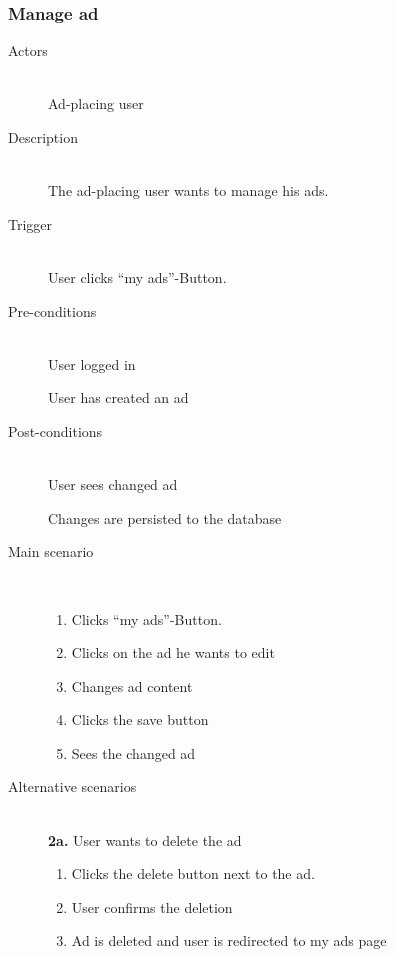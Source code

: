 \documentclass[a4wide]{article}
\begin{document}
\subsubsection{Manage ad}
\begin{description}
\item[Actors]\mbox{}\\
Ad-placing user
\item[Description]\mbox{}\\
The ad-placing user wants to manage his ads.
\item[Trigger]\mbox{}\\
User clicks “my ads”-Button.
\item[Pre-conditions]\mbox{}\\
User logged in

User has created an ad

\item[Post-conditions]\mbox{}\\
User sees changed ad

Changes are persisted to the database
\item[Main scenario]\mbox{}\\
\begin{enumerate}
\item Clicks “my ads”-Button.
\item Clicks on the ad he wants to edit
\item Changes ad content
\item Clicks the save button
\item Sees the changed ad
\end{enumerate}
\item[Alternative scenarios]\mbox{}\\
\textbf{2a.} User wants to delete the ad
\begin{enumerate}
\item Clicks the delete button next to the ad.
\item User confirms the deletion
\item Ad is deleted and user is redirected to my ads page
\end{enumerate}
\end{description}
\end{document}
